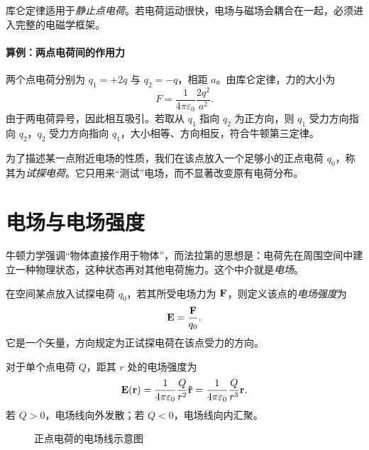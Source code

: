 \begin{remark}
库仑定律适用于\emph{静止点电荷}。若电荷运动很快，电场与磁场会耦合在一起，必须进入完整的电磁学框架。
\end{remark}

\paragraph{算例：两点电荷间的作用力} 两个点电荷分别为 $q_1=+2q$ 与 $q_2=-q$，相距 $a$。由库仑定律，力的大小为
\begin{equation}
F = \frac{1}{4\pi\varepsilon_0}\frac{2q^2}{a^2}.
\end{equation}
由于两电荷异号，因此相互吸引。若取从 $q_1$ 指向 $q_2$ 为正方向，则 $q_1$ 受力方向指向 $q_2$，$q_2$ 受力方向指向 $q_1$，大小相等、方向相反，符合牛顿第三定律。

\begin{definition}[试探电荷]
为了描述某一点附近电场的性质，我们在该点放入一个足够小的正点电荷 $q_0$，称其为\emph{试探电荷}。它只用来“测试”电场，而不显著改变原有电荷分布。
\end{definition}

\section{电场与电场强度}

牛顿力学强调“物体直接作用于物体”，而法拉第的思想是：电荷先在周围空间中建立一种物理状态，这种状态再对其他电荷施力。这个中介就是\emph{电场}。

\begin{definition}[电场与电场强度]
在空间某点放入试探电荷 $q_0$，若其所受电场力为 $\vb{F}$，则定义该点的\emph{电场强度}为
\begin{equation}
\vb{E} = \frac{\vb{F}}{q_0}.
\end{equation}
它是一个矢量，方向规定为正试探电荷在该点受力的方向。
\end{definition}

对于单个点电荷 $Q$，距其 $r$ 处的电场强度为
\begin{equation}
\vb{E}(\vb{r}) = \frac{1}{4\pi\varepsilon_0}\frac{Q}{r^2}\vu{r}
= \frac{1}{4\pi\varepsilon_0}\frac{Q}{r^3}\vb{r}.
\end{equation}
若 $Q>0$，电场线向外发散；若 $Q<0$，电场线向内汇聚。

\begin{figure}[H]
\centering
{}
\caption{正点电荷的电场线示意图}
\end{figure}


